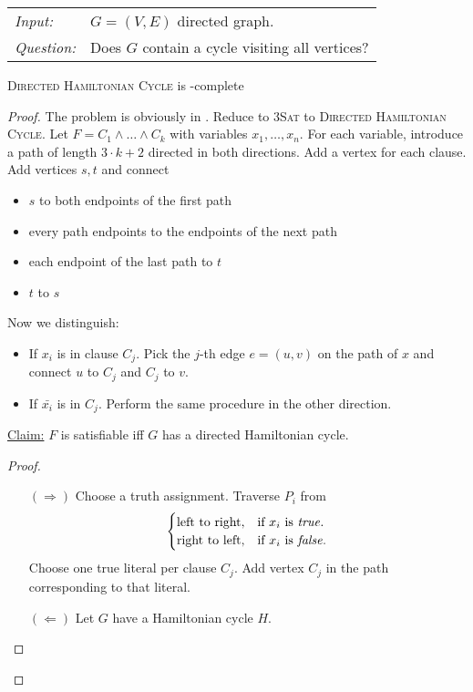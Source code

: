 \documentclass[../skript.tex]{subfiles}
\begin{document}
\begin{problem}
\begin{tabular}{@{}ll}
\textit{Input:} & $G = (V, E)$ directed graph. \\
\textit{Question:} & Does $G$ contain a cycle visiting all vertices?
\end{tabular}
\end{problem}
\begin{theorem} %
\label{thm:6}
\textsc{Directed Hamiltonian Cycle} is \NP-complete
\end{theorem}
\begin{proof}
The problem is obviously in \NP.
Reduce to \textsc{3Sat} to \textsc{Directed Hamiltonian Cycle}. Let $F = C_1 \wedge \ldots \wedge C_k$ with variables $x_1, \ldots, x_n$.
For each variable, introduce a path of length $3 \cdot k + 2$ directed in both directions.
Add a vertex for each clause. Add vertices $s, t$ and connect
\begin{itemize}
\item $s$ to both endpoints of the first path
\item every path endpoints to the endpoints of the next path
\item each endpoint of the last path to $t$
\item $t$ to $s$
\end{itemize}
Now we distinguish:
\begin{itemize}
\item If $x_i$ is in clause $C_j$. Pick the $j$-th edge $e = (u, v)$ on the path of $x$ and connect $u$ to $C_j$ and $C_j$ to $v$.
\item If $\bar{x_i}$ is in $C_j$. Perform the same procedure in the other direction.
\end{itemize}
\underline{Claim:} $F$ is satisfiable \ac{iff} $G$ has a directed Hamiltonian cycle.
\begin{proof}
\begin{itemize}
\item[$(\Rightarrow)$] Choose a truth assignment. Traverse $P_i$ from
\[
\begin{cases}
\text{left to right}, & \text{if } x_i \text{ is \textit{true}}. \\
\text{right to left}, & \text{if } x_i \text{ is \textit{false}}.
\end{cases}
\]
Choose one true literal per clause $C_j$. Add vertex $C_j$ in the path corresponding to that literal.
\item[$(\Leftarrow)$] Let $G$ have a Hamiltonian cycle $H$. \\

\end{itemize}
\end{proof}
\end{proof}
\end{document}
